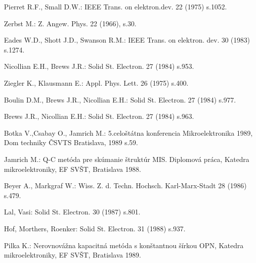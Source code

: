 \begin{thebibliography}{}

Pierret R.F., Small D.W.: IEEE Trans. on elektron.dev. 22 (1975) s.1052.

Zerbst M.: Z. Angew. Phys. 22 (1966), s.30.

Eades W.D., Shott J.D., Swanson R.M.: IEEE Trans. on elektron. dev. 30 (1983) s.1274.

Nicollian E.H., Brews J.R.: Solid St. Electron.  27 (1984) s.953.

Ziegler K., Klausmann E.: Appl. Phys. Lett. 26 (1975) s.400.

Boulin D.M., Brews J.R., Nicollian E.H.: Solid St. Electron. 27  (1984) s.977.

Brews J.R., Nicollian E.H.: Solid  St. Electron. 27 (1984) s.963.

Botka V.,Csabay O., Jamrich M.: 5.celoštátna konferencia Mikroelektronika 1989, Dom techniky ČSVTS Bratislava, 1989 s.59.

Jamrich M.: Q-C metóda pre skúmanie štruktúr MIS. Diplomová práca, Katedra mikroelektroniky, EF SVŠT, Bratislava 1988.

Beyer A., Markgraf W.: Wiss. Z. d. Techn. Hochsch. Karl-Marx-Stadt 28 (1986) s.479.

Lal, Vasi: Solid St. Electron. 30 (1987) s.801.

Hof, Morthers, Roenker: Solid St. Electron. 31 (1988) s.937.

Pilka K.: Nerovnovážna kapacitná metóda s konštantnou šírkou OPN, Katedra mikroelektroniky, EF SVŠT, Bratislava 1989.

\end{thebibliography}
